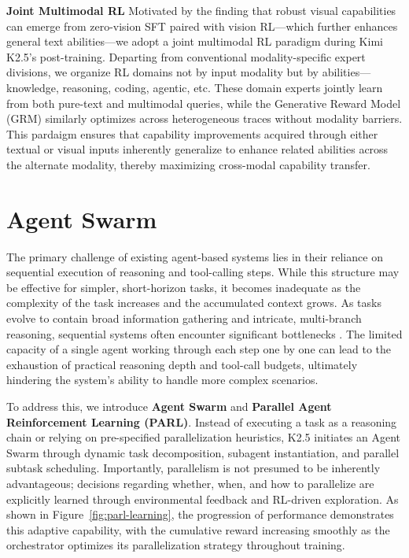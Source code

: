 \documentclass{article}
\newcommand{\citep}[1]{\parencite{#1}}
\begin{document}
\textbf{Joint Multimodal RL} Motivated by the finding that robust visual capabilities can emerge from zero-vision SFT paired with vision RL---which further enhances general text abilities---we adopt a joint multimodal RL paradigm during Kimi K2.5's post-training. Departing from conventional modality-specific expert divisions, we organize RL domains not by input modality but by abilities---knowledge, reasoning, coding, agentic, etc. These domain experts jointly learn from both pure-text and multimodal queries, while the Generative Reward Model (GRM) similarly optimizes across heterogeneous traces without modality barriers. This pardaigm ensures that capability improvements acquired through either textual or visual inputs inherently generalize to enhance related abilities across the alternate modality, thereby maximizing cross-modal capability transfer.

\section{Agent Swarm}
The primary challenge of existing agent-based systems lies in their reliance on {sequential execution} of reasoning and tool-calling steps. While this structure may be effective for simpler, short-horizon tasks, it becomes inadequate as the complexity of the task increases and the accumulated context grows. As tasks evolve to contain broad information gathering and intricate, multi-branch reasoning, sequential systems often encounter significant bottlenecks \citep{anthropicbuildmultiagent,opus45report,claudemultiagent}. The limited capacity of a single agent working through each step one by one can lead to the exhaustion of practical reasoning depth and tool-call budgets, ultimately hindering the system's ability to handle more complex scenarios. 

To address this, we introduce \textbf{Agent Swarm} and \textbf{Parallel Agent Reinforcement Learning (PARL)}. Instead of executing a task as a reasoning chain or relying on pre-specified parallelization heuristics, K2.5 initiates an Agent Swarm through dynamic task decomposition, subagent instantiation, and parallel subtask scheduling. Importantly, parallelism is not presumed to be inherently advantageous; decisions regarding whether, when, and how to parallelize are explicitly learned through environmental feedback and RL-driven exploration. 
As shown in Figure~\ref{fig:parl-learning}, the progression of performance  demonstrates this adaptive capability, with the cumulative reward increasing smoothly as the orchestrator optimizes its parallelization strategy throughout training. 
\end{document}
